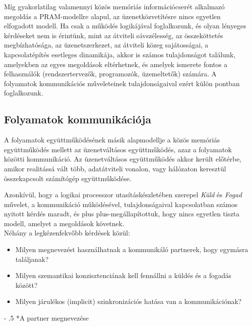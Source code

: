 \documentclass[tikz,12pt,margin=0px]{article}
\makeatletter
\renewcommand\paragraph{%
	\@startsection{paragraph}{4}{0mm}%
	{-\baselineskip}%
	{.5\baselineskip}%
	{\normalfont\normalsize\bfseries}}
\newcommand\lword[1]{\leavevmode\nobreak\hskip0pt plus\linewidth\penalty50\hskip0pt plus-\linewidth\nobreak #1}
\makeatother
\begin{document}
    \noindent Míg gyakorlatilag valamennyi közös memóriás információcserét alkalmazó megoldás a PRAM-modellre alapul, az üzenetközvetítésre nincs egyetlen elfogadott modell. Ha csak a működés logikájával foglalkozunk, és olyan lényeges kérdéseket nem is érintünk, mint az átviteli sávszélesség, az összeköttetés megbízhatósága, az üzenetszerkezet, az átviteli közeg sajátosságai, a kapcsolatépítés esetleges dinamikája, akkor is számos tulajdonságot találunk, amelyekben az egyes megoldások eltérhetnek, és amelyek ismerete fontos a felhasználók (rendszertervezők, programozók, üzemeltetők) számára. A folyamatok kommunikációs műveleteinek tulajdonságaival ezért külön pontban foglalkozunk.

    \subsection*{Folyamatok kommunikációja}

    A folyamatok együttműködésének másik alapmodellje a közös memóriás együttműködés mellett az üzenetváltásos együttműködés, azaz a folyamatok közötti kommunikáció. Az üzenetváltásos együttműködés akkor került előtérbe, amikor realitássá vált több, adatátviteli vonalon, vagy hálózaton keresztül összekapcsolt számítógép együttműködése.

    \noindent Azonkívül, hogy a logikai processzor utasításkészletében szerepel \emph{Küld} és \emph{Fogad} művelet, a kommunikáció működésével, tulajdonságaival kapcsolatban számos nyitott kérdés maradt, és \lword{megállapítottuk}, hogy nincs egyetlen tiszta modell, amelyet a megoldások követnek.\\

    \noindent Néhány a legkézenfekvőbb kérdések közül:
    \begin{itemize}[topsep=8pt,itemsep=4pt,partopsep=4pt, parsep=4pt]
        \item Milyen megnevezést használhatnak a kommunikáló partnerek, hogy egymásra találjanak?
        \item Milyen szemantikai konzisztenciának kell fennállni a küldés és a fogadás között?
        \item Milyen járulékos (implicit) szinkronizációs hatása van a kommunikációnak?
    \end{itemize}

    \paragraph*{A partner megnevezése}
\end{document}
